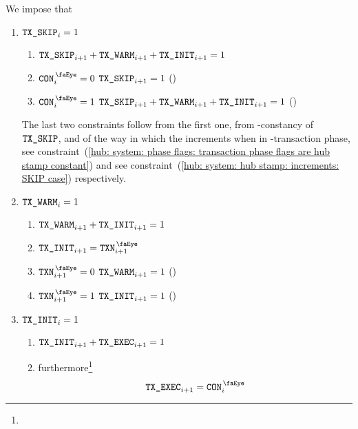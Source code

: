 We impose that
\begin{enumerate}
        \item \If $\texttt{TX}\texttt{\_SKIP} _{i} = 1$ \Then
                \begin{enumerate}
                        \item $\texttt{TX}\texttt{\_SKIP} _{i + 1} + \texttt{TX}\texttt{\_WARM} _{i + 1} + \texttt{TX}\texttt{\_INIT} _{i + 1} = 1$
                        \item \If $\peekContext _{i} = 0$ \Then $\texttt{TX}\texttt{\_SKIP} _{i + 1} = 1$ (\sanityCheck)
                        \item \If $\peekContext _{i} = 1$ \Then $\texttt{TX}\texttt{\_SKIP} _{i + 1} + \texttt{TX}\texttt{\_WARM} _{i + 1} + \texttt{TX}\texttt{\_INIT} _{i + 1} = 1$ (\sanityCheck)
                \end{enumerate}
                \saNote{}
                The last two constraints follow from the first one,
                from \hubStamp-constancy of $\texttt{TX}\texttt{\_SKIP}$,
                and of the way in which the \hubStamp{} increments when in \txSkip-transaction phase,
                see constraint~(\ref{hub: system: phase flags: transaction phase flags are hub stamp constant}) and
                see constraint~(\ref{hub: system: hub stamp: increments: SKIP case}) respectively.
        \item \If $\texttt{TX}\texttt{\_WARM} _{i} = 1$ \Then
                \begin{enumerate}
                        \item $\texttt{TX}\texttt{\_WARM} _{i + 1} + \texttt{TX}\texttt{\_INIT} _{i + 1} = 1$
                        \item $\txInit _{i + 1} = \peekTransaction _{i + 1}$
                        \item \If $\peekTransaction _{i + 1} = 0$ \Then $\texttt{TX}\texttt{\_WARM} _{i + 1} = 1$ (\sanityCheck)
                        \item \If $\peekTransaction _{i + 1} = 1$ \Then $\texttt{TX}\texttt{\_INIT} _{i + 1} = 1$ (\sanityCheck)
                \end{enumerate}
        \item \If $\texttt{TX}\texttt{\_INIT} _{i} = 1$ \Then
                \begin{enumerate}
                        \item $\texttt{TX}\texttt{\_INIT} _{i + 1} + \texttt{TX}\texttt{\_EXEC} _{i + 1} = 1$
                        \item furthermore\footnote{}
                                \[
                                        \txExec _{i + 1} = \peekContext _{i}
                                \]
                \end{enumerate}

\end{enumerate}
